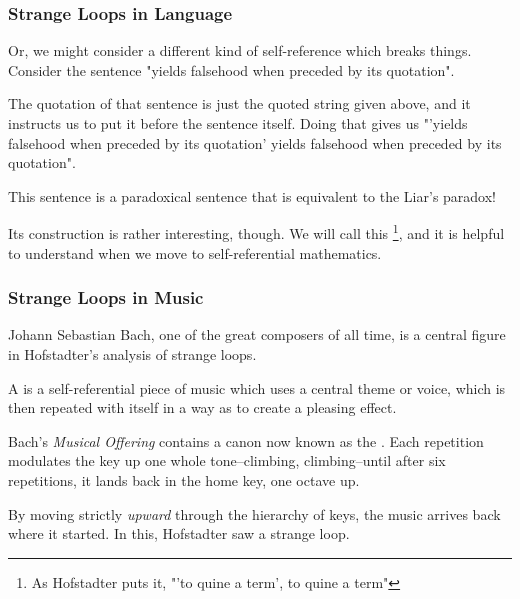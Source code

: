 \documentclass[aspectratio=169]{beamer}
\begin{document}
\begin{frame}[fragile]
  \frametitle{Strange Loops in Language}

  Or, we might consider a different kind of self-reference which breaks things.
  Consider the sentence "yields falsehood when preceded by its quotation".

  \pause
  \vspace{\fill}

  The quotation of that sentence is just the quoted string given above, and
  it instructs us to put it before the sentence itself. Doing that gives us
  "'yields falsehood when preceded by its quotation' yields falsehood when preceded by its quotation".

  \pause
  \vspace{\fill}

  This sentence is a paradoxical sentence that is equivalent to the Liar's paradox!

  \pause
  \vspace{\fill}

  Its construction is rather interesting, though. We will call this \footnote{
    As Hofstadter puts it, "'to quine a term', to quine a term"
  },
  and it is helpful to understand when we move to self-referential mathematics.

\end{frame}

\begin{frame}[fragile]
  \frametitle{Strange Loops in Music}


  Johann Sebastian Bach, one of the great composers of all time, is
  a central figure in Hofstadter's analysis of strange loops.

  \pause
  \vspace{\fill}

  A  is a self-referential piece of music which uses
  a central theme or voice, which is then repeated with itself in
  a way as to create a pleasing effect.

  \pause
  \vspace{\fill}

  Bach's \textit{Musical Offering} contains a canon now known as the
  . Each repetition modulates the key up
  one whole tone--climbing, climbing--until after six repetitions, it
  lands back in the home key, one octave up.

  \pause
  \vspace{\fill}

  By moving strictly \textit{upward} through the hierarchy of keys, the
  music arrives back where it started. In this, Hofstadter saw a strange
  loop.
\end{frame}
\end{document}

